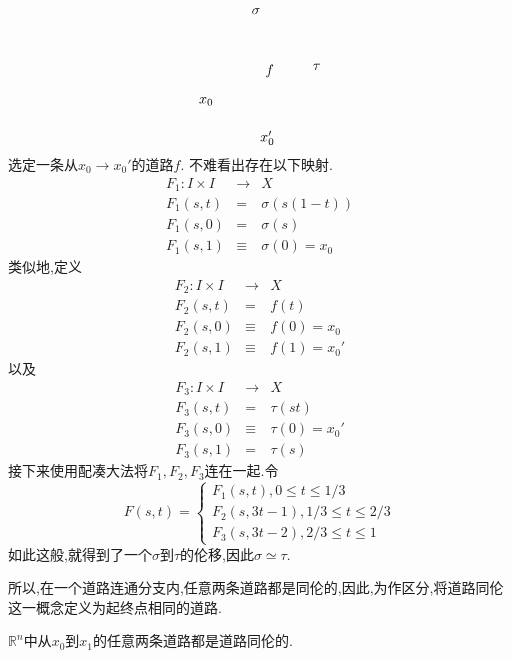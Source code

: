 \documentclass{article}
\begin{document}
\begin{example}
\[\begin{tikzpicture}[x=0.75pt,y=0.75pt,yscale=-1,xscale=1]
    \draw (231,203.4) node [anchor=north west][inner sep=0.75pt]    {$x_{0}$};
    \draw (281,118.4) node [anchor=north west][inner sep=0.75pt]    {$\sigma $};
    \draw (339,171.4) node [anchor=north west][inner sep=0.75pt]    {$\tau $};
    \draw (289,235.4) node [anchor=north west][inner sep=0.75pt]    {$x_{0} '$};
    \draw (294,172.4) node [anchor=north west][inner sep=0.75pt]    {$f$};
    \end{tikzpicture}\]    
   选定一条从$x_0 \to x_0'$的道路$f$.
   不难看出存在以下映射.
   \begin{eqnarray*}
    F_1 : I \times I &\to& X\\
    F_1(s,t) &=& \sigma(s(1-t))\\
    F_1(s,0) &=& \sigma(s)\\
    F_1(s,1) &\equiv& \sigma(0) = x_0
   \end{eqnarray*}
   类似地,定义
   \begin{eqnarray*}
    F_2 : I \times I &\to& X\\
    F_2(s,t) &=& f(t)\\
    F_2(s,0) &\equiv & f(0) = x_0\\
    F_2(s,1) &\equiv & f(1) = x_0'
   \end{eqnarray*}
   以及
   \begin{eqnarray*}
    F_3 : I \times I &\to& X\\
    F_3(s,t) &=& \tau(st)\\
    F_3(s,0) &\equiv& \tau(0) = x_0'\\
    F_3(s,1) &=& \tau(s)
   \end{eqnarray*}
接下来使用配凑大法将$F_1,F_2,F_3$连在一起.令
$$
F(s,t) = \left\{
    \begin{array}{c}
        F_1(s,t) ,0 \leq t \leq 1/3\\
        F_2(s,3t-1) , 1/3 \leq t \leq 2/3\\
        F_3(s,3t-2) , 2/3 \leq t \leq 1
    \end{array}
\right.
$$
如此这般,就得到了一个$\sigma$到$\tau$的伦移,因此$\sigma \simeq \tau$.

所以,在一个道路连通分支内,任意两条道路都是同伦的,因此,为作区分,将道路同伦这一概念定义为起终点相同的道路.
\end{example}


\begin{example}
    $\mathbb{R}^n$中从$x_0$到$x_1$的任意两条道路都是道路同伦的.
\end{example}
\end{document}
